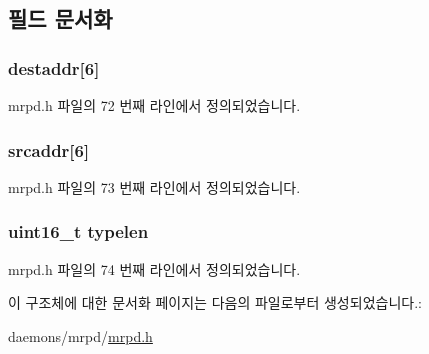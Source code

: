 \subsection{필드 문서화}
\subsubsection[{\texorpdfstring{destaddr}{destaddr}}]{ destaddr\mbox{[}6\mbox{]}}\hypertarget{structeth__hdr_a28d4ce6cefd6bcaad82b0cf1fb6f189a}{}\label{structeth__hdr_a28d4ce6cefd6bcaad82b0cf1fb6f189a}


mrpd.\+h 파일의 72 번째 라인에서 정의되었습니다.

\subsubsection[{\texorpdfstring{srcaddr}{srcaddr}}]{ srcaddr\mbox{[}6\mbox{]}}\hypertarget{structeth__hdr_aeeb6cb7e4de7ccfa502c3e4616af41ad}{}\label{structeth__hdr_aeeb6cb7e4de7ccfa502c3e4616af41ad}


mrpd.\+h 파일의 73 번째 라인에서 정의되었습니다.

\subsubsection[{\texorpdfstring{typelen}{typelen}}]{\setlength{\rightskip}{0pt plus 5cm}uint16\+\_\+t typelen}\hypertarget{structeth__hdr_a657ead984e65fc7252e805e62f083a7c}{}\label{structeth__hdr_a657ead984e65fc7252e805e62f083a7c}


mrpd.\+h 파일의 74 번째 라인에서 정의되었습니다.



이 구조체에 대한 문서화 페이지는 다음의 파일로부터 생성되었습니다.\+:\begin{DoxyCompactItemize}
\item 
daemons/mrpd/\hyperlink{mrpd_8h}{mrpd.\+h}\end{DoxyCompactItemize}
